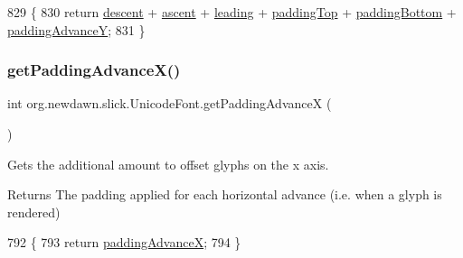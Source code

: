 \begin{DoxyCode}
829                                \{
830         \textcolor{keywordflow}{return} \mbox{\hyperlink{classorg_1_1newdawn_1_1slick_1_1_unicode_font_a950be0068111dc978c95345cc6cadddf}{descent}} + \mbox{\hyperlink{classorg_1_1newdawn_1_1slick_1_1_unicode_font_a195706fa1491e793a4b923dd844b594f}{ascent}} + \mbox{\hyperlink{classorg_1_1newdawn_1_1slick_1_1_unicode_font_a2288222beb428489eccae8d71f278e37}{leading}} + \mbox{\hyperlink{classorg_1_1newdawn_1_1slick_1_1_unicode_font_acadcc8c595615d077e2c0039818292f2}{paddingTop}} + 
      \mbox{\hyperlink{classorg_1_1newdawn_1_1slick_1_1_unicode_font_a101f8814305c63cba7b7bbb7d1bf87ae}{paddingBottom}} + \mbox{\hyperlink{classorg_1_1newdawn_1_1slick_1_1_unicode_font_ac04c92b5304822a4187a2e7184f4aca8}{paddingAdvanceY}};
831     \}
\end{DoxyCode}
\mbox{\label{classorg_1_1newdawn_1_1slick_1_1_unicode_font_a51f2a48ec3062648508078779ff36856}} 
\subsubsection{\texorpdfstring{get\+Padding\+Advance\+X()}{getPaddingAdvanceX()}}
{\footnotesize\ttfamily int org.\+newdawn.\+slick.\+Unicode\+Font.\+get\+Padding\+AdvanceX (\begin{DoxyParamCaption}{ }\end{DoxyParamCaption})\hspace{0.3cm}{\ttfamily [inline]}}

Gets the additional amount to offset glyphs on the x axis.

\begin{DoxyReturn}{Returns}
The padding applied for each horizontal advance (i.\+e. when a glyph is rendered) 
\end{DoxyReturn}

\begin{DoxyCode}
792                                     \{
793         \textcolor{keywordflow}{return} \mbox{\hyperlink{classorg_1_1newdawn_1_1slick_1_1_unicode_font_a347a5d8b2baa6ab7f037d5f869504883}{paddingAdvanceX}};
794     \}
\end{DoxyCode}
\mbox{\label{classorg_1_1newdawn_1_1slick_1_1_unicode_font_a352039fb85e36e9660d3b6aae03641eb}} 
